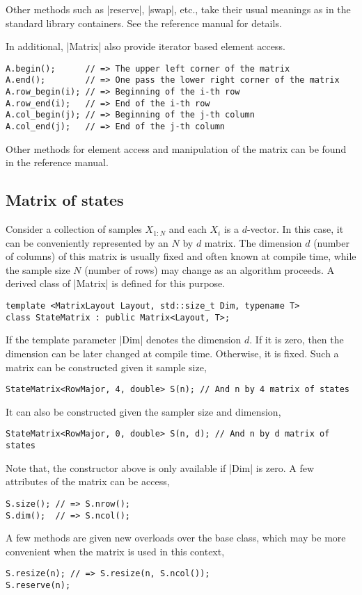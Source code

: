 Other methods such as |reserve|, |swap|, etc., take their usual meanings as in
the standard library containers. See the reference manual for details.

In additional, |Matrix| also provide iterator based element access.
\begin{verbatim}
A.begin();      // => The upper left corner of the matrix
A.end();        // => One pass the lower right corner of the matrix
A.row_begin(i); // => Beginning of the i-th row
A.row_end(i);   // => End of the i-th row
A.col_begin(j); // => Beginning of the j-th column
A.col_end(j);   // => End of the j-th column
\end{verbatim}
Other methods for element access and manipulation of the matrix can be found in
the reference manual.

\subsection{Matrix of states}
\label{sub:Matrix of states}

Consider a collection of samples $X_{1:N}$ and each $X_i$ is a $d$-vector. In
this case, it can be conveniently represented by an $N$ by $d$ matrix. The
dimension $d$ (number of columns) of this matrix is usually fixed and often
known at compile time, while the sample size $N$ (number of rows) may change as
an algorithm proceeds. A derived class of |Matrix| is defined for this purpose.
\begin{verbatim}
template <MatrixLayout Layout, std::size_t Dim, typename T>
class StateMatrix : public Matrix<Layout, T>;
\end{verbatim}
If the template parameter |Dim| denotes the dimension $d$. If it is zero, then
the dimension can be later changed at compile time. Otherwise, it is fixed.
Such a matrix can be constructed given it sample size,
\begin{verbatim}
StateMatrix<RowMajor, 4, double> S(n); // And n by 4 matrix of states
\end{verbatim}
It can also be constructed given the sampler size and dimension,
\begin{verbatim}
StateMatrix<RowMajor, 0, double> S(n, d); // And n by d matrix of states
\end{verbatim}
Note that, the constructor above is only available if |Dim| is zero. A few
attributes of the matrix can be access,
\begin{verbatim}
S.size(); // => S.nrow();
S.dim();  // => S.ncol();
\end{verbatim}
A few methods are given new overloads over the base class, which may be more
convenient when the matrix is used in this context,
\begin{verbatim}
S.resize(n); // => S.resize(n, S.ncol());
S.reserve(n);
\end{verbatim}


